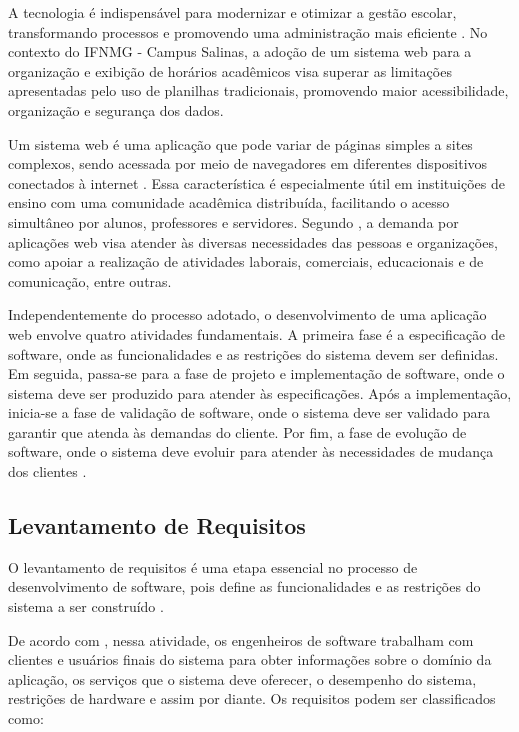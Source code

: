 A tecnologia é indispensável para modernizar e otimizar a gestão escolar, transformando processos e promovendo uma administração mais eficiente \cite{Urania2024}. No contexto do IFNMG - Campus Salinas, a adoção de um sistema web para a organização e exibição de horários acadêmicos visa superar as limitações apresentadas pelo uso de planilhas tradicionais, promovendo maior acessibilidade, organização e segurança dos dados.

Um sistema web é uma aplicação que pode variar de páginas simples a sites complexos, sendo acessada por meio de navegadores em diferentes dispositivos conectados à internet \cite{pressman2016engenharia}. Essa característica é especialmente útil em instituições de ensino com uma comunidade acadêmica distribuída, facilitando o acesso simultâneo por alunos, professores e servidores. Segundo , a demanda por aplicações web visa atender às diversas necessidades das pessoas e organizações, como apoiar a realização de atividades laborais, comerciais, educacionais e de comunicação, entre outras.

Independentemente do processo adotado, o desenvolvimento de uma aplicação web envolve quatro atividades fundamentais. A primeira fase é a especificação de software, onde as funcionalidades e as restrições do sistema devem ser definidas. Em seguida, passa-se para a fase de projeto e implementação de software, onde o sistema deve ser produzido para atender às especificações. Após a implementação, inicia-se a fase de validação de software, onde o sistema deve ser validado para garantir que atenda às demandas do cliente. Por fim, a fase de evolução de software, onde o sistema deve evoluir para atender às necessidades de mudança dos clientes \cite{sommerville2011engenharia}.

\subsection{Levantamento de Requisitos}

O levantamento de requisitos é uma etapa essencial no processo de desenvolvimento de software, pois define as funcionalidades e as restrições do sistema a ser construído \cite{Balieiro_Pinto_2025}.

De acordo com , nessa atividade, os engenheiros de software trabalham com clientes e usuários finais do sistema para obter informações sobre o domínio da aplicação, os serviços que o sistema deve oferecer, o desempenho do sistema, restrições de hardware e assim por diante. Os requisitos podem ser classificados como:

